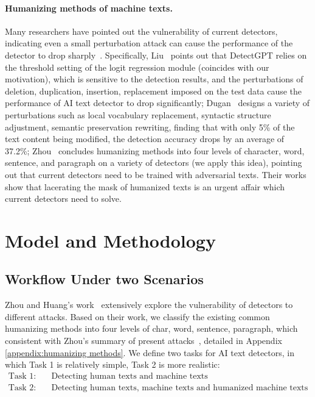 \documentclass[11pt]{article}
\newcommand{\greenCite}[1]{\textcolor{darkgreen}{\cite{#1}}}
\newcommand{\greenCitep}[1]{\textcolor{darkgreen}{\citep{#1}}}
\begin{document}
	\paragraph{Humanizing methods of machine texts.} 
	Many researchers have pointed out the vulnerability of current detectors, indicating even a small perturbation attack can cause the performance of the detector to drop sharply~\greenCitep{zhou2024navigatingshadows,dugan2024raid,krishna2024paraphrasing,liu2024pecola,huang2024ai,wang2024stumblingblocks}. Specifically, Liu~\greenCite{liu2024pecola} points out that DetectGPT relies on the threshold setting of the logit regression module (coincides with our motivation), which is sensitive to the detection results, and the perturbations of deletion, duplication, insertion, replacement imposed on the test data cause the performance of AI text detector to drop significantly; Dugan~\greenCite{dugan2024raid} designs a variety of perturbations such as local vocabulary replacement, syntactic structure adjustment, semantic preservation rewriting, finding that with only 5\% of the text content being modified, the detection accuracy drops by an average of 37.2\%; Zhou~\greenCite{zhou2024navigatingshadows} concludes humanizing methods into four levels of character, word, sentence, and paragraph on a variety of detectors (we apply this idea), pointing out that current detectors need to be trained with adversarial texts. Their works show that lacerating the mask of humanized texts is an urgent affair which current detectors need to solve.
	
	
	\section{Model and Methodology}
	\subsection{Workflow Under two Scenarios}
	\label{subsec:framework}
	Zhou and Huang's work~\greenCite{zhou2024navigatingshadows,huang2024ai} extensively explore the vulnerability of detectors to different attacks. Based on their work, we classify the existing common humanizing methods into four levels of char, word, sentence, paragraph, which consistent with Zhou's summary of present attacks~\greenCite{zhou2024navigatingshadows}, detailed in Appendix \ref{appendix:humanizing methods}. We define two tasks for AI text detectors, in which Task 1 is relatively simple, Task 2 is more realistic:
	$$
	\begin{aligned}
		\text{Task 1}: \quad &\text{Detecting human texts and machine texts}\\
		\text{Task 2}: \quad &\text{Detecting human texts, machine texts and humanized machine texts}\\
	\end{aligned}
	$$
	\label{eq:tasks_define}
	
\end{document}
